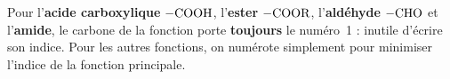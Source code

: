 \documentclass[11pt,a4paper]{article}
\begin{document}
\begin{piege}
Pour l'\textbf{acide carboxylique} $-\ce{COOH}$, l'\textbf{ester} $-\ce{COOR}$, l'\textbf{aldéhyde} $-\ce{CHO}$ et l'\textbf{amide}, le carbone de la fonction porte \textbf{toujours} le numéro~1 : inutile d'écrire son indice. Pour les autres fonctions, on numérote simplement pour minimiser l'indice de la fonction principale.
\end{piege}
\end{document}
